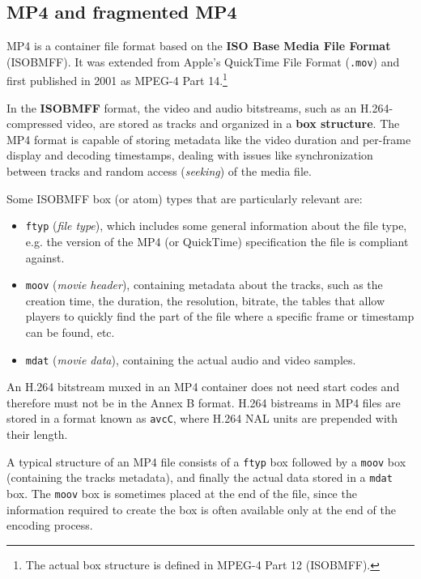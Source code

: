 \subsection{MP4 and fragmented MP4}
\label{sec:bg/containers/mp4}

MP4 is a container file format based on the \textbf{ISO Base Media File Format} (ISOBMFF). It was extended from Apple's QuickTime File Format (\texttt{.mov}) and first published in 2001 as MPEG-4 Part 14.\footnote{The actual box structure is defined in MPEG-4 Part 12 (ISOBMFF).}\cite{mpeg4part12}

In the \textbf{ISOBMFF} format, the video and audio bitstreams, such as an H.264-compressed video, are stored as tracks and organized in a \textbf{box structure}. The MP4 format is capable of storing metadata like the video duration and per-frame display and decoding timestamps, dealing with issues like synchronization between tracks and random access (\textit{seeking}) of the media file.


Some ISOBMFF box (or atom) types that are particularly relevant are:

\begin{itemize}
    \item \texttt{ftyp} (\textit{file type}), which includes some general information about the file type, e.g. the version of the MP4 (or QuickTime) specification the file is compliant against.
    \item \texttt{moov} (\textit{movie header}), containing metadata about the tracks, such as the creation time, the duration, the resolution, bitrate, the tables that allow players to quickly find the part of the file where a specific frame or timestamp can be found, etc.
    \item \texttt{mdat} (\textit{movie data}), containing the actual audio and video samples.
\end{itemize}

An H.264 bitstream muxed in an MP4 container does not need start codes and therefore must not be in the Annex B format. H.264 bistreams in MP4 files are stored in a format known as \texttt{avcC}, where H.264 NAL units are prepended with their length.

A typical structure of an MP4 file consists of a \texttt{ftyp} box followed by a \texttt{moov} box (containing the tracks metadata), and finally the actual data stored in a \texttt{mdat} box. The \texttt{moov} box is sometimes placed at the end of the file, since the information required to create the box is often available only at the end of the encoding process.

